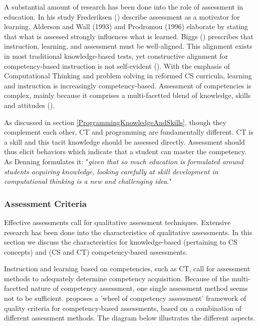 A substantial amount of research has been done into the role of assessment in education. In his study Frederiksen (\cite{frederiksen1984}) describe assessment as a motivator for learning. Alderson and Wall (1993) and Prodromou (1996) elaborate by stating that what is assessed strongly influences what is learned. Biggs (\cite{biggs1996}) prescribes that instruction, learning, and assessment must be well-aligned. This alignment exists in most traditional knowledge-based tests, yet constructive alignment for competency-based instruction is not self-evident (\cite{baartman2006wheel}). With the emphasis of Computational Thinking and problem solving in reformed CS curricula, learning and instruction is increasingly competency-based. Assessment of competencies is complex, mainly because it comprises a multi-facetted blend of knowledge, skills and attitudes (\cite{merrienboer2002competenties}).


As discussed in section \ref{ProgrammingKnowledgeAndSkills}, though they complement each other, CT and programming are fundamentally different. CT is a skill and this tacit knowledge should be assessed directly\cite{denning2017remaining}. Assessment should thus elicit behaviors which indicate that a student can master the competency. As Denning formulates it: "\emph{given that so much education is formulated around students acquiring knowledge, looking carefully at skill development in computational thinking is a new and challenging idea}."\cite{denning2017remaining}




\subsubsection*{Assessment Criteria}\label{sec:qualityCriteria}
Effective assessments call for qualitative assessment techniques. Extensive research has been done into the characteristics of qualitative assessments. In this section we discuss the characteristics for knowledge-based (pertaining to CS concepts) and (CS and CT) competency-based assessments.


Instruction and learning based on competencies, such as CT, call for assessment methods to adequately determine competency acquisition. Because of the multi-facetted nature of competency assessment, one single assessment method seems not to be sufficient.  proposes a 'wheel of competency assessment' framework of quality criteria for competency-based assessments, based on a combination of different assessment methods. The diagram below illustrates the different aspects.


